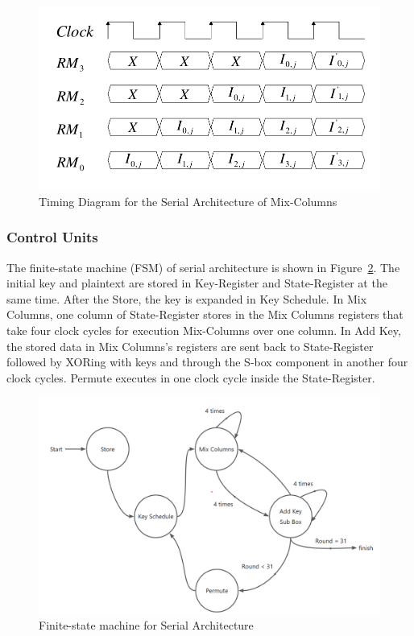 \documentclass[sn-basic]{sn-jnl}%
\begin{document}
\begin{figure}[h]%
    \centering
    \includegraphics[width=\textwidth]{Mix-Columns-Times.pdf}
    \caption{Timing Diagram for the Serial Architecture of Mix-Columns }\label{serial_time_diagrm_mix_colunms}
\end{figure}

\subsubsection{Control Units}\label{subsubsec3}

The finite-state machine (FSM) of serial architecture is shown in Figure~\ref{serial_fsm_fig}.
The initial key and plaintext are stored in Key-Register and State-Register at the same time. After the Store, the key is expanded in Key Schedule.
In Mix Columns, one column of State-Register stores in the Mix Columns registers that take four clock cycles for execution Mix-Columns over one column.
In Add Key, the stored data in Mix Columns's registers are sent back to State-Register followed by XORing with keys and through the S-box component in another four clock cycles.
Permute executes in one clock cycle inside the State-Register.

\begin{figure}[h]%
    \centering
    \includegraphics[width=\textwidth]{serial_fsm.png}
    \caption{Finite-state machine for Serial Architecture}\label{serial_fsm_fig}
\end{figure}
\end{document}

